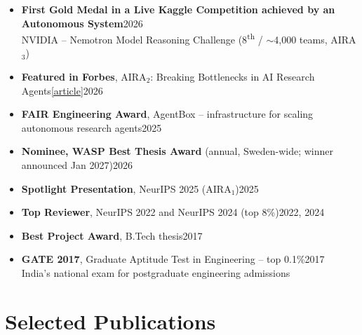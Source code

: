 \documentclass[a4paper,10pt]{article}
\newenvironment{cvitems}
  {\begin{itemize}[leftmargin=1.1em, label={\textbullet}, topsep=2pt, itemsep=2pt, parsep=0pt]}
  {\end{itemize}}
\newcommand{\cvlink}[2]{\href{#2}{\small\textcolor{accent}{[#1]}}}
\begin{document}
\begin{cvitems}
  \item \textbf{First Gold Medal in a Live Kaggle Competition achieved by an Autonomous System}\hfill{\small\color{subtle}2026}\\
    {\small NVIDIA -- Nemotron Model Reasoning Challenge (8\textsuperscript{th} / $\sim$4,000 teams, AIRA$_3$)}
  \item \textbf{Featured in Forbes}, AIRA$_2$: Breaking Bottlenecks in AI Research Agents\;\cvlink{article}{https://www.forbes.com/sites/jonmarkman/2026/04/01/aira_2-breaking-bottlenecks-in-ai-research-agents/}\hfill{\small\color{subtle}2026}
  \item \textbf{FAIR Engineering Award}, AgentBox -- infrastructure for scaling autonomous research agents\hfill{\small\color{subtle}2025}
    \item \textbf{Nominee, WASP Best Thesis Award} (annual, Sweden-wide; winner announced Jan 2027)\hfill{\small\color{subtle}2026}
  \item \textbf{Spotlight Presentation}, NeurIPS 2025 (AIRA$_1$)\hfill{\small\color{subtle}2025}
  \item \textbf{Top Reviewer}, NeurIPS 2022 and NeurIPS 2024 (top 8\%)\hfill{\small\color{subtle}2022, 2024}
  \item \textbf{Best Project Award}, B.Tech thesis\hfill{\small\color{subtle}2017}
  \item \textbf{GATE 2017}, Graduate Aptitude Test in Engineering -- top 0.1\%\hfill{\small\color{subtle}2017}\\
    {\small India's national exam for postgraduate engineering admissions}
\end{cvitems}

\section{Selected Publications}
\end{document}
